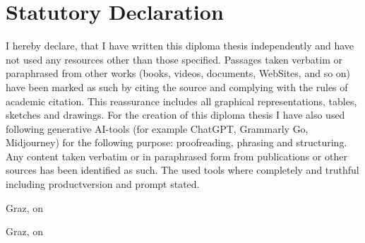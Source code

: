\documentclass[a4paper,12pt]{article}
\begin{document}
\newpage
\section*{Statutory Declaration}
I hereby declare,
that I have written this diploma thesis independently and have not used any resources other than those specified. Passages taken verbatim or paraphrased from other works (books, videos, documents, WebSites, and so on) have been marked as such by citing the source and complying with the rules of academic citation.
This reassurance includes all graphical representations, tables, sketches and drawings. 
For the creation of this diploma thesis I have also used following generative AI-tools (for example ChatGPT, Grammarly Go, Midjourney) for the following purpose: proofreading, phrasing and structuring. Any content taken verbatim or in paraphrased form from publications or other sources has been identified as such.
The used tools where completely and truthful including productversion and prompt stated.

Graz, on \hspace{2cm}

Graz, on \hspace{2cm}
\end{document}
